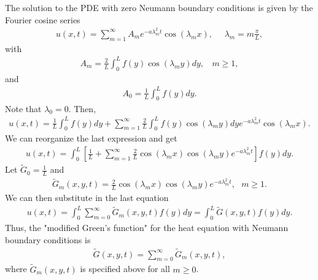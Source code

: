 \begin{questions}
\begin{solution}
The solution to the PDE with zero Neumann boundary conditions is given by the Fourier cosine series
\begin{align*}
u(x,t)=\sum_{m=1}^{\infty}A_me^{-a\lambda_m^2t}\cos(\lambda_mx),~~~~~~\lambda_m=m\frac{\pi}{L},
\end{align*}
with
\begin{align*}
A_m=\frac{2}{L}\int_0^Lf(y)\cos(\lambda_my)dy,~~~~m\geq 1,
\end{align*}
and
\begin{align*}
A_0=\frac{1}{L}\int_0^Lf(y)dy.
\end{align*}
Note that $\lambda_0=0$. Then,
\begin{align*}
u(x,t)=\frac{1}{L}\int_0^Lf(y)dy+\sum_{m=1}^{\infty}\frac{2}{L}\int_0^Lf(y)\cos(\lambda_my)dye^{-a\lambda_m^2t}\cos(\lambda_mx).
\end{align*}
We can reorganize the last expression and get
\begin{align*}
u(x,t)=\int_0^L\left[\frac{1}{L}+\sum_{m=1}^{\infty}\frac{2}{L}\cos(\lambda_mx)\cos(\lambda_my)e^{-a\lambda_m^2t}\right]f(y)dy.
\end{align*}
Let $\tilde{G}_0=\frac{1}{L}$ and
\begin{align*}
\tilde{G}_m(x,y,t)=\frac{2}{L}\cos(\lambda_mx)\cos(\lambda_my)e^{-a\lambda_m^2t},~~~m\geq 1.
\end{align*}
We can then substitute in the last equation
\begin{align*}
u(x,t)=\int_0^L\sum_{m=0}^{\infty}\tilde{G}_m(x,y,t) f(y)dy=\int_0^L\tilde{G}(x,y,t) f(y)dy.
\end{align*}
Thus, the "modified Green's function" for the heat equation with Neumann boundary conditions is
\begin{align*}
\tilde{G}(x,y,t)=\sum_{m=0}^{\infty}\tilde{G}_m(x,y,t),
\end{align*}
where $\tilde{G}_m(x,y,t)$ is specified above for all $m\geq 0$.
\end{solution}
\end{questions}
